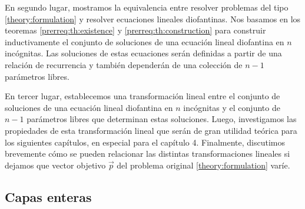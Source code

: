 En segundo lugar, mostramos la equivalencia entre resolver problemas del tipo
\eqref{theory:formulation} y resolver ecuaciones lineales diofantinas. Nos basamos en los teoremas
\ref{prerreq:th:existence} y \ref{prerreq:th:construction} para construir inductivamente el conjunto
de soluciones de una ecuación lineal diofantina en $n$ incógnitas. Las soluciones de estas
ecuaciones serán definidas a partir de una relación de recurrencia y también dependerán de una
colección de $n - 1$ parámetros libres.

En tercer lugar, establecemos una transformación lineal entre el conjunto de soluciones de una ecuación
lineal diofantina en $n$ incógnitas y el conjunto de $n - 1$ parámetros libres que determinan estas
soluciones. Luego, investigamos las propiedades de esta transformación lineal que serán de gran utilidad
teórica para los siguientes capítulos, en especial para el capítulo 4. Finalmente, discutimos
brevemente cómo se pueden relacionar las distintas transformaciones lineales si dejamos que vector
objetivo $\vec{p}$ del problema original \eqref{theory:formulation} varíe.

\subsection{Capas enteras}
\label{subsec:sym}


